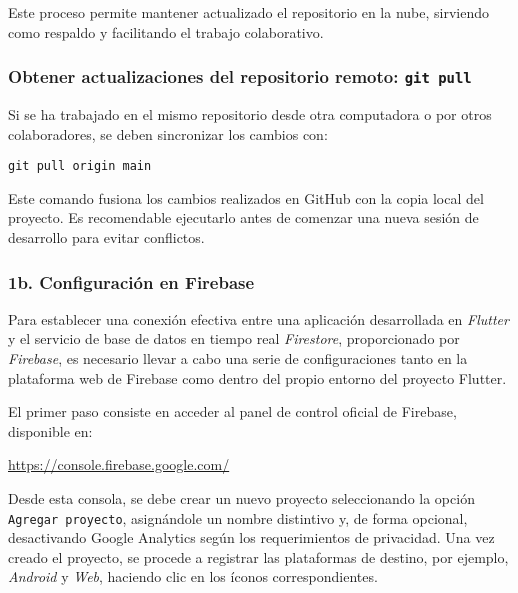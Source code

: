 Este proceso permite mantener actualizado el repositorio en la nube, sirviendo como respaldo y facilitando el trabajo colaborativo.

\subsubsection*{Obtener actualizaciones del repositorio remoto: \texttt{git pull}}

Si se ha trabajado en el mismo repositorio desde otra computadora o por otros colaboradores, se deben sincronizar los cambios con:

\begin{verbatim}
git pull origin main
\end{verbatim}

Este comando fusiona los cambios realizados en GitHub con la copia local del proyecto. Es recomendable ejecutarlo antes de comenzar una nueva sesión de desarrollo para evitar conflictos.


















\subsubsection{1b. Configuración en Firebase} 
Para establecer una conexión efectiva entre una aplicación desarrollada en \textit{Flutter} y el servicio de base de datos en tiempo real \textit{Firestore}, proporcionado por \textit{Firebase}, es necesario llevar a cabo una serie de configuraciones tanto en la plataforma web de Firebase como dentro del propio entorno del proyecto Flutter.

El primer paso consiste en acceder al panel de control oficial de Firebase, disponible en:

\begin{center}
  \url{https://console.firebase.google.com/}
\end{center}

Desde esta consola, se debe crear un nuevo proyecto seleccionando la opción \texttt{Agregar proyecto}, asignándole un nombre distintivo y, de forma opcional, desactivando Google Analytics según los requerimientos de privacidad. Una vez creado el proyecto, se procede a registrar las plataformas de destino, por ejemplo, \textit{Android} y \textit{Web}, haciendo clic en los íconos correspondientes.

